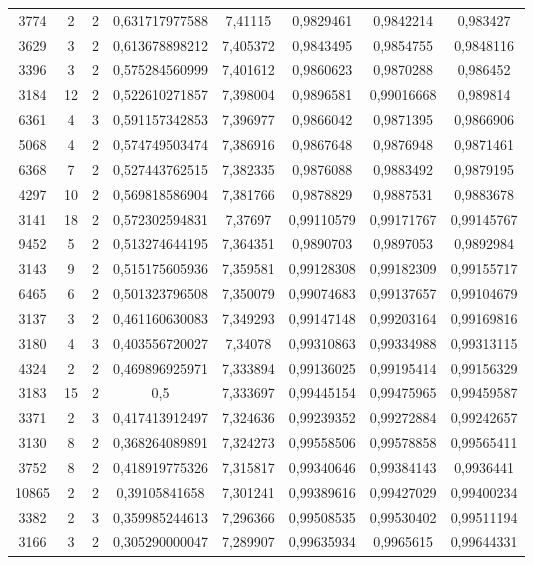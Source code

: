 \begin{longtable}{|c|c|c|c|c|c|c|c|}
3774 & 2 & 2 & 0,631717977588 & 7,41115 & 0,9829461 & 0,9842214 & 0,983427 \\
3629 & 3 & 2 & 0,613678898212 & 7,405372 & 0,9843495 & 0,9854755 & 0,9848116 \\
3396 & 3 & 2 & 0,575284560999 & 7,401612 & 0,9860623 & 0,9870288 & 0,986452 \\
3184 & 12 & 2 & 0,522610271857 & 7,398004 & 0,9896581 & 0,99016668 & 0,989814 \\
6361 & 4 & 3 & 0,591157342853 & 7,396977 & 0,9866042 & 0,9871395 & 0,9866906 \\
5068 & 4 & 2 & 0,574749503474 & 7,386916 & 0,9867648 & 0,9876948 & 0,9871461 \\
6368 & 7 & 2 & 0,527443762515 & 7,382335 & 0,9876088 & 0,9883492 & 0,9879195 \\
4297 & 10 & 2 & 0,569818586904 & 7,381766 & 0,9878829 & 0,9887531 & 0,9883678 \\
3141 & 18 & 2 & 0,572302594831 & 7,37697 & 0,99110579 & 0,99171767 & 0,99145767 \\
9452 & 5 & 2 & 0,513274644195 & 7,364351 & 0,9890703 & 0,9897053 & 0,9892984 \\
3143 & 9 & 2 & 0,515175605936 & 7,359581 & 0,99128308 & 0,99182309 & 0,99155717 \\
6465 & 6 & 2 & 0,501323796508 & 7,350079 & 0,99074683 & 0,99137657 & 0,99104679 \\
3137 & 3 & 2 & 0,461160630083 & 7,349293 & 0,99147148 & 0,99203164 & 0,99169816 \\
3180 & 4 & 3 & 0,403556720027 & 7,34078 & 0,99310863 & 0,99334988 & 0,99313115 \\
4324 & 2 & 2 & 0,469896925971 & 7,333894 & 0,99136025 & 0,99195414 & 0,99156329 \\
3183 & 15 & 2 & 0,5 & 7,333697 & 0,99445154 & 0,99475965 & 0,99459587 \\
3371 & 2 & 3 & 0,417413912497 & 7,324636 & 0,99239352 & 0,99272884 & 0,99242657 \\
3130 & 8 & 2 & 0,368264089891 & 7,324273 & 0,99558506 & 0,99578858 & 0,99565411 \\
3752 & 8 & 2 & 0,418919775326 & 7,315817 & 0,99340646 & 0,99384143 & 0,9936441 \\
10865 & 2 & 2 & 0,39105841658 & 7,301241 & 0,99389616 & 0,99427029 & 0,99400234 \\
3382 & 2 & 3 & 0,359985244613 & 7,296366 & 0,99508535 & 0,99530402 & 0,99511194 \\
3166 & 3 & 2 & 0,305290000047 & 7,289907 & 0,99635934 & 0,9965615 & 0,99644331 \\

\end{longtable}
